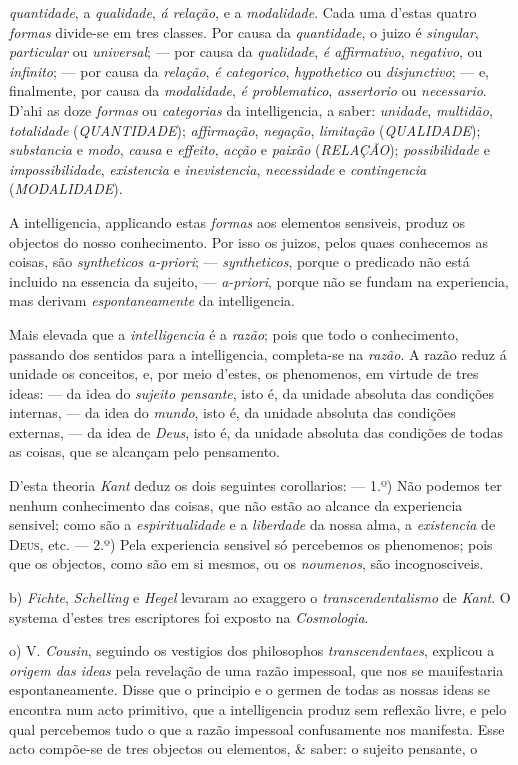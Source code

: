 \emph{quantidade}, a \emph{qualidade}, \emph{á relação}, e a \emph{modalidade}. Cada uma d'estas quatro \emph{formas} divide-se em tres classes. Por causa da \emph{quantidade}, o juizo é \emph{singular}, \emph{particular} ou \emph{universal}; --- por causa da \emph{qualidade}, \emph{é affirmativo}, \emph{negativo}, ou \emph{infinito}; --- por causa da \emph{relação}, \emph{é categorico}, \emph{hypothetico} ou \emph{disjunctivo}; --- e, finalmente, por causa da \emph{modalidade}, \emph{é problematico}, \emph{assertorio} ou \emph{necessario}. D'ahi as doze \emph{formas} ou \emph{categorias} da intelligencia, a saber: \emph{unidade}, \emph{multidão}, \emph{totalidade} (\emph{QUANTIDADE}); \emph{affirmação}, \emph{negação}, \emph{limitação} (\emph{QUALIDADE}); \emph{substancia} e \emph{modo}, \emph{causa} e \emph{effeito}, \emph{acção} e \emph{paixão} (\emph{RELAÇÃO}); \emph{possibilidade} e \emph{impossibilidade}, \emph{existencia} e \emph{inevistencia}, \emph{necessidade} e \emph{contingencia} (\emph{MODALIDADE}).\par A intelligencia, applicando estas \emph{formas} aos elementos sensiveis, produz os objectos do nosso conhecimento. Por isso os juizos, pelos quaes conhecemos as coisas, são \emph{syntheticos a-priori}; --- \emph{syntheticos}, porque o predicado não está incluido na essencia da sujeito, --- \emph{a-priori}, porque não se fundam na experiencia, mas derivam \emph{espontaneamente} da intelligencia.\par Mais elevada que a \emph{intelligencia} é a \emph{razão}; pois que todo o conhecimento, passando dos sentidos para a intelligencia, completa-se na \emph{razão}. A razão reduz á unidade os conceitos, e, por meio d'estes, os phenomenos, em virtude de tres ideas: --- da idea do \emph{sujeito pensante}, isto é, da unidade absoluta das condições internas, --- da idea do \emph{mundo}, isto é, da unidade absoluta das condições externas, --- da idea de \emph{Deus}, isto é, da unidade absoluta das condições de todas as coisas, que se alcançam pelo pensamento.\par D'esta theoria \emph{Kant} deduz os dois seguintes corollarios: --- 1.º) Não podemos ter nenhum conhecimento das coisas, que não estão ao alcance da experiencia sensivel; como são a \emph{espiritualidade} e a \emph{liberdade} da nossa alma, a \emph{existencia} de \textsc{Deus}, etc. --- 2.º) Pela experiencia sensivel só percebemos os phenomenos; pois que os objectos, como são em si mesmos, ou os \emph{noumenos}, são incognosciveis.\par b) \emph{Fichte}, \emph{Schelling} e \emph{Hegel} levaram ao exaggero o \emph{transcendentalismo} de \emph{Kant}. O systema d'estes tres escriptores foi exposto na \emph{Cosmologia}.\par o) V. \emph{Cousin}, seguindo os vestigios dos philosophos \emph{transcendentaes}, explicou a \emph{origem das ideas} pela revelação de uma razão impessoal, que nos se mauifestaria espontaneamente. Disse que o principio e o germen de todas as nossas ideas se encontra num acto primitivo, que a intelligencia produz sem reflexão livre, e pelo qual percebemos tudo o que a razão impessoal confusamente nos manifesta. Esse acto compõe-se de tres objectos ou elementos, \& saber: o sujeito pensante, o 